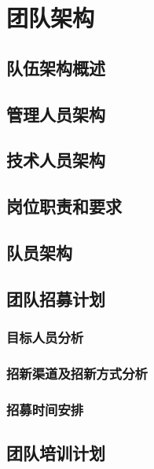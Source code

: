 \section{团队架构}

    \subsection{队伍架构概述}
    
        \noindent
    
    \subsection{管理人员架构}

    \subsection{技术人员架构}

    \subsection{岗位职责和要求}
    
    \subsection{队员架构}

    \subsection{团队招募计划}

        \subsubsection{目标人员分析}

        \subsubsection{招新渠道及招新方式分析}

        \subsubsection{招募时间安排}

    \subsection{团队培训计划}

